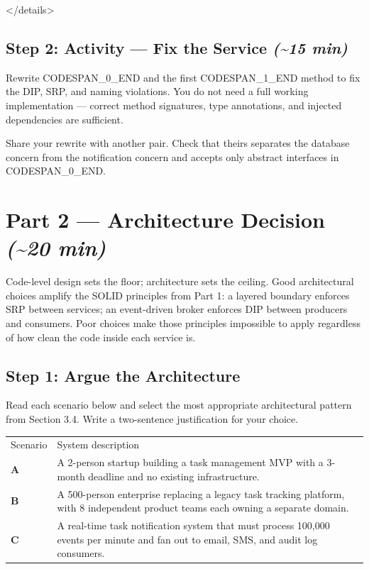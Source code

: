 \documentclass[11pt,a4paper]{book}
\begin{document}
</details>

\subsection{Step 2: Activity --- Fix the Service \textit{(\textasciitilde{}15 min)}}

Rewrite CODESPAN\_0\_END and the first CODESPAN\_1\_END method to fix the DIP, SRP, and naming violations. You do not need a full working implementation --- correct method signatures, type annotations, and injected dependencies are sufficient.

Share your rewrite with another pair. Check that theirs separates the database concern from the notification concern and accepts only abstract interfaces in CODESPAN\_0\_END.

\medskip

\section{Part 2 --- Architecture Decision \textit{(\textasciitilde{}20 min)}}

Code-level design sets the floor; architecture sets the ceiling. Good architectural choices amplify the SOLID principles from Part 1: a layered boundary enforces SRP between services; an event-driven broker enforces DIP between producers and consumers. Poor choices make those principles impossible to apply regardless of how clean the code inside each service is.

\subsection{Step 1: Argue the Architecture}

Read each scenario below and select the most appropriate architectural pattern from Section 3.4. Write a two-sentence justification for your choice.

\begin{tabular}{ll}
\hline
Scenario & System description \\
\textbf{A} & A 2-person startup building a task management MVP with a 3-month deadline and no existing infrastructure. \\
\textbf{B} & A 500-person enterprise replacing a legacy task tracking platform, with 8 independent product teams each owning a separate domain. \\
\textbf{C} & A real-time task notification system that must process 100,000 events per minute and fan out to email, SMS, and audit log consumers. \\
\hline
\end{tabular}
\end{document}
